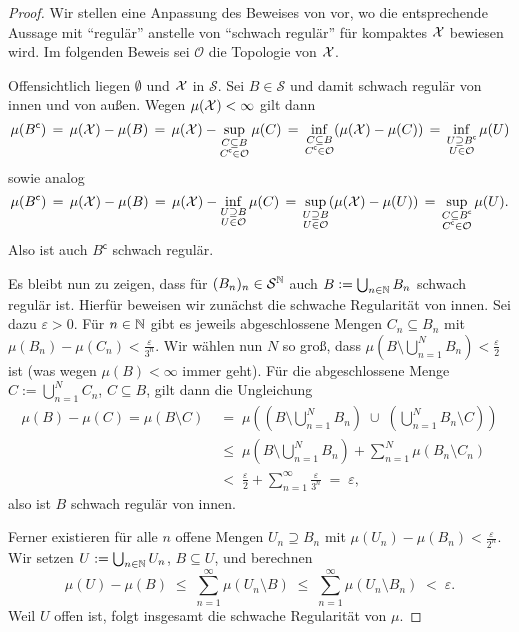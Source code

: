 \documentclass[../thesis/thesis.tex]{subfiles}
\begin{document}
	\begin{proof}
		Wir stellen eine Anpassung des Beweises von 
		\cite[Lemma 4.5.5]{Simon.2015} vor, wo die entsprechende Aussage mit \enquote{regulär} 
		anstelle von \enquote{schwach regulär} für kompaktes $\mathcal{X}$ bewiesen wird. Im folgenden Beweis sei $\mathcal{O}$ die Topologie von $\mathcal{X}$.
		
		Offensichtlich liegen $\emptyset$ und $\mathcal{X}$ in $\mathcal{S}$. Sei 
		$B \in \mathcal{S}$ und damit schwach regulär 
		von innen und von außen. Wegen $\mu(\mathcal{X}) < \infty$ gilt dann
		\[ \mu(B^\mathsf{c}) 
		\, = \, \mu(\mathcal{X}) - \mu(B) 
		\, = \, \mu(\mathcal{X}) - \sup_{\substack{C \subseteq B \\ C^\mathsf{c} \in \mathcal{O}}} \mu(C) 
		\, = \, \inf_{\substack{C \subseteq B \\ C^\mathsf{c} \in \mathcal{O}}} (\mu(\mathcal{X}) - \mu(C))
		\, = \, \inf_{\substack{U \supseteq B^\mathsf{c} \\ U \in \mathcal{O}}} \mu(U) \]
		sowie analog
		\[ \mu(B^\mathsf{c}) 
		\, = \, \mu(\mathcal{X}) - \mu(B) 
		\, = \, \mu(\mathcal{X}) - \inf_{\substack{U \supseteq B \\ U \in \mathcal{O}}} \mu(C)
		\, = \, \sup_{\substack{U \supseteq B \\ U \in \mathcal{O}}} (\mu(\mathcal{X}) - \mu(U))
		\, = \, \sup_{\substack{C \subseteq B^\mathsf{c} \\ C^\mathsf{c} \in 
				\mathcal{O}}} \mu(U) \text{.} \]
		Also ist auch $B^\mathsf{c}$ schwach regulär. 
		
		Es bleibt nun zu zeigen, dass für $(B_n)_n \in \mathcal{S}^{\mathbb{N}}$ auch $B \vcentcolon = 
		\bigcup_{n \in \mathbb{N}} B_n$ schwach regulär ist. 
		Hierfür beweisen wir zunächst die schwache Regularität von innen. 
		Sei dazu $\varepsilon > 0$. Für $n \in \mathbb{N}$ gibt es jeweils abgeschlossene Mengen 
		$C_n \subseteq B_n$ mit $\mu(B_n) - \mu(C_n) < \frac{\varepsilon}{3^n}$.
		Wir wählen nun $N$ so groß, dass $\mu\left( B \setminus \bigcup_{n=1}^N B_n \right) 
		< \frac{\varepsilon}{2}$ ist (was wegen $\mu(B) < \infty$ immer geht). 
		Für die abgeschlossene Menge $C := \bigcup_{n=1}^N C_n$, $C \subseteq B$, gilt dann die Ungleichung 
		\begin{align*}
			\mu(B) - \mu(C) = \mu(B\setminus C) \; &=
			\; \mu\left( \left( B \setminus \bigcup_{n=1}^N B_n \right) \; \cup \; 
			\left( \bigcup_{n=1}^N B_n  \setminus C \right) \right) \\
			&\leq \; \mu \left( B \setminus \bigcup_{n=1}^N B_n \right) + 
			\sum_{n=1}^{N} \mu(B_n \setminus C_n) \\
			&<    \; \frac{\varepsilon}{2} + 
			\sum_{n=1}^{\infty} \frac{\varepsilon}{3^n} \; = \; \varepsilon \text{,}
		\end{align*}
		also ist $B$ schwach regulär von innen.
		
		Ferner existieren für alle $n$ offene Mengen $U_n \supseteq B_n$ 
		mit $\mu(U_n) - \mu(B_n) < \frac{\varepsilon}{2^n}$. Wir setzen 
		$U := \bigcup_{n \in \mathbb{N}} U_n$, $B \subseteq U$, und berechnen  
		$$\mu(U) - \mu(B) \; \leq \; \sum_{n=1}^\infty \mu(U_n \setminus B) \; \leq \; 
		\sum_{n=1}^\infty \mu(U_n \setminus B_n) \; < \; \varepsilon \text{.}$$
		Weil $U$ offen ist, folgt insgesamt die schwache Regularität von $\mu$.
	\end{proof}
	
\end{document}
